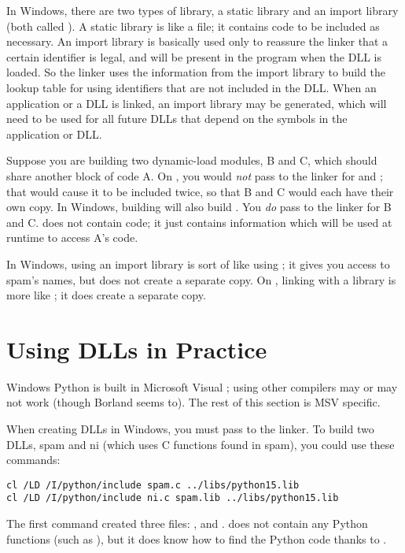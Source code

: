 In Windows, there are two types of library, a static library and an
import library (both called ).  A static library is like a
\UNIX{}  file; it contains code to be included as necessary.
An import library is basically used only to reassure the linker that a
certain identifier is legal, and will be present in the program when
the DLL is loaded.  So the linker uses the information from the
import library to build the lookup table for using identifiers that
are not included in the DLL.  When an application or a DLL is linked,
an import library may be generated, which will need to be used for all
future DLLs that depend on the symbols in the application or DLL.

Suppose you are building two dynamic-load modules, B and C, which should
share another block of code A.  On \UNIX, you would \emph{not} pass
 to the linker for  and ; that would
cause it to be included twice, so that B and C would each have their
own copy.  In Windows, building  will also build
.  You \emph{do} pass  to the linker for B and
C.   does not contain code; it just contains information
which will be used at runtime to access A's code.  

In Windows, using an import library is sort of like using ; it gives you access to spam's names, but does not create a
separate copy.  On \UNIX, linking with a library is more like
; it does create a separate copy.


\section{Using DLLs in Practice \label{win-dlls}}

Windows Python is built in Microsoft Visual \Cpp; using other
compilers may or may not work (though Borland seems to).  The rest of
this section is MSV\Cpp{} specific.

When creating DLLs in Windows, you must pass  to
the linker.  To build two DLLs, spam and ni (which uses C functions
found in spam), you could use these commands:

\begin{verbatim}
cl /LD /I/python/include spam.c ../libs/python15.lib
cl /LD /I/python/include ni.c spam.lib ../libs/python15.lib
\end{verbatim}

The first command created three files: ,
 and .   does not contain
any Python functions (such as ), but it
does know how to find the Python code thanks to .


